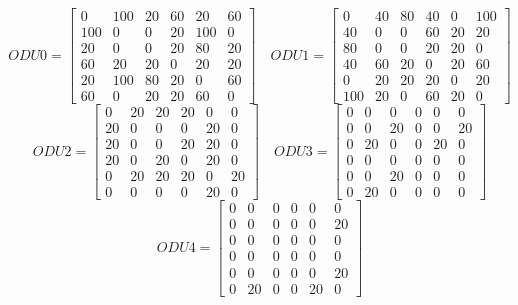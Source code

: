 \[
ODU0=
  \begin{bmatrix}
    0 & 100 & 20 & 60 & 20 & 60 \\
    100 & 0 & 0 & 20 & 100 & 0 \\
    20 & 0 & 0 & 20 & 80 & 20 \\
    60 & 20 & 20 & 0 & 20 & 20 \\
    20 & 100 & 80 & 20 & 0 & 60 \\
    60 & 0 & 20 & 20 & 60 & 0
  \end{bmatrix}
\quad ODU1=
  \begin{bmatrix}
    0 & 40 & 80 & 40 & 0 & 100 \\
    40 & 0 & 0 & 60 & 20 & 20 \\
    80 & 0 & 0 & 20 & 20 & 0 \\
    40 & 60 & 20 & 0 & 20 & 60 \\
    0 & 20 & 20 & 20 & 0 & 20 \\
    100 & 20 & 0 & 60 & 20 & 0
  \end{bmatrix}
\]
\[
ODU2=
  \begin{bmatrix}
    0 & 20 & 20 & 20 & 0 & 0 \\
    20 & 0 & 0 & 0 & 20 & 0 \\
    20 & 0 & 0 & 20 & 20 & 0 \\
    20 & 0 & 20 & 0 & 20 & 0 \\
    0 & 20 & 20 & 20 & 0 & 20 \\
    0 & 0 & 0 & 0 & 20 & 0
  \end{bmatrix}
\quad ODU3=
  \begin{bmatrix}
    0 & 0 & 0 & 0 & 0 & 0 \\
    0 & 0 & 20 & 0 & 0 & 20 \\
    0 & 20 & 0 & 0 & 20 & 0 \\
    0 & 0 & 0 & 0 & 0 & 0 \\
    0 & 0 & 20 & 0 & 0 & 0 \\
    0 & 20 & 0 & 0 & 0 & 0
  \end{bmatrix}
\]
\[
ODU4=
  \begin{bmatrix}
    0 & 0 & 0 & 0 & 0 & 0 \\
    0 & 0 & 0 & 0 & 0 & 20 \\
    0 & 0 & 0 & 0 & 0 & 0 \\
    0 & 0 & 0 & 0 & 0 & 0 \\
    0 & 0 & 0 & 0 & 0 & 20 \\
    0 & 20 & 0 & 0 & 20 & 0
  \end{bmatrix}
\]

